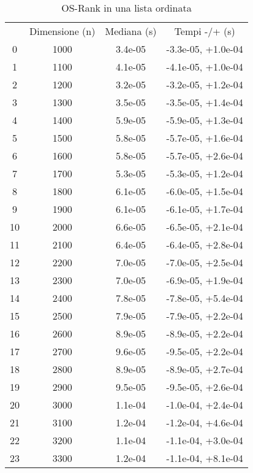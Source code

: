 \begin{table}
\centering
\caption{OS-Rank in una lista ordinata}
\label{OS-Rank in una lista ordinata}
\begin{adjustbox}{width=1\textwidth/2}
\begin{tabular}{|c|c|c|c|}
\hline
 & Dimensione (n) & Mediana (s) & Tempi -/+ (s) \\
0 & 1000 & 3.4e-05 & -3.3e-05, +1.0e-04 \\
\cline{1-4}
1 & 1100 & 4.1e-05 & -4.1e-05, +1.0e-04 \\
\cline{1-4}
2 & 1200 & 3.2e-05 & -3.2e-05, +1.2e-04 \\
\cline{1-4}
3 & 1300 & 3.5e-05 & -3.5e-05, +1.4e-04 \\
\cline{1-4}
4 & 1400 & 5.9e-05 & -5.9e-05, +1.3e-04 \\
\cline{1-4}
5 & 1500 & 5.8e-05 & -5.7e-05, +1.6e-04 \\
\cline{1-4}
6 & 1600 & 5.8e-05 & -5.7e-05, +2.6e-04 \\
\cline{1-4}
7 & 1700 & 5.3e-05 & -5.3e-05, +1.2e-04 \\
\cline{1-4}
8 & 1800 & 6.1e-05 & -6.0e-05, +1.5e-04 \\
\cline{1-4}
9 & 1900 & 6.1e-05 & -6.1e-05, +1.7e-04 \\
\cline{1-4}
10 & 2000 & 6.6e-05 & -6.5e-05, +2.1e-04 \\
\cline{1-4}
11 & 2100 & 6.4e-05 & -6.4e-05, +2.8e-04 \\
\cline{1-4}
12 & 2200 & 7.0e-05 & -7.0e-05, +2.5e-04 \\
\cline{1-4}
13 & 2300 & 7.0e-05 & -6.9e-05, +1.9e-04 \\
\cline{1-4}
14 & 2400 & 7.8e-05 & -7.8e-05, +5.4e-04 \\
\cline{1-4}
15 & 2500 & 7.9e-05 & -7.9e-05, +2.2e-04 \\
\cline{1-4}
16 & 2600 & 8.9e-05 & -8.9e-05, +2.2e-04 \\
\cline{1-4}
17 & 2700 & 9.6e-05 & -9.5e-05, +2.2e-04 \\
\cline{1-4}
18 & 2800 & 8.9e-05 & -8.9e-05, +2.7e-04 \\
\cline{1-4}
19 & 2900 & 9.5e-05 & -9.5e-05, +2.6e-04 \\
\cline{1-4}
20 & 3000 & 1.1e-04 & -1.0e-04, +2.4e-04 \\
\cline{1-4}
21 & 3100 & 1.2e-04 & -1.2e-04, +4.6e-04 \\
\cline{1-4}
22 & 3200 & 1.1e-04 & -1.1e-04, +3.0e-04 \\
\cline{1-4}
23 & 3300 & 1.2e-04 & -1.1e-04, +8.1e-04 \\

\end{tabular}
\end{adjustbox}
\end{table}
